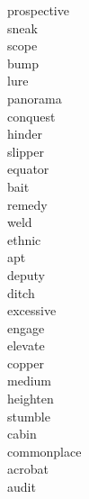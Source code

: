 \documentclass[a4paper, 11pt]{ctexart}
\begin{document}
\begin{multicols*}{3}
\begin{description}
\item[prospective]

\item[sneak]

\item[scope]

\item[bump]

\item[lure]

\item[panorama]

\item[conquest]

\item[hinder]

\item[slipper]

\item[equator]

\item[bait]

\item[remedy]

\item[weld]

\item[ethnic]

\item[apt]

\item[deputy]

\item[ditch]

\item[excessive]

\item[engage]

\item[elevate]

\item[copper]

\item[medium]

\item[heighten]

\item[stumble]

\item[cabin]

\item[commonplace]

\item[acrobat]

\item[audit]


\end{description}
\end{multicols*}
\end{document}
